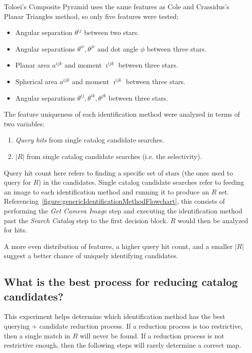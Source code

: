 Toloei's Composite Pyramid uses the same features as Cole and Crassidus's Planar Triangles method, so only five
features were tested:
\begin{itemize}
    \item Angular separation $\theta^{ij}$ between two stars.
    \item Angular separations $\theta^{ic}, \theta^{jc}$ and dot angle $\phi$ between three stars.
    \item Planar area $a^{ijk}$ and moment $\imath^{ijk}$ between three stars.
    \item Spherical area $a^{ijk}$ and moment $\imath^{ijk}$ between three stars.
    \item Angular separations $\theta^{ij}, \theta^{ik}, \theta^{jk}$ between three stars.
\end{itemize}

The feature uniqueness of each identification method were analyzed in terms of two variables:
\begin{enumerate}
    \item \label{itm:hitCountFeature} \textit{Query hits} from single catalog candidate searches.
    \item $|R|$ from single catalog candidate searches (i.e. the selectivity).
\end{enumerate}

Query hit count here refers to finding a specific set of stars (the ones used to query for $R$) in the candidates.
Single catalog candidate searches refer to feeding an image to each identification method and running it to produce
an $R$ set.
Referencing~\autoref{figure:genericIdentificationMethodFlowchart}, this consists of performing the \textit{Get Camera
Image} step and executing the identification method past the \textit{Search Catalog} step to the first decision
block.
$R$ would then be analyzed for hits.

A more even distribution of features, a higher query hit count, and a smaller $|R|$ suggest a better chance of uniquely
identifying candidates.

\subsection{What is the best process for reducing catalog candidates?}\label{subsec:candidateReductionMethods}
This experiment helps determine which identification method has the best querying + candidate reduction process.
If a reduction process is too restrictive, then a single match in $R$ will never be found.
If a reduction process is not restrictive enough, then the following steps will rarely determine a correct map.

